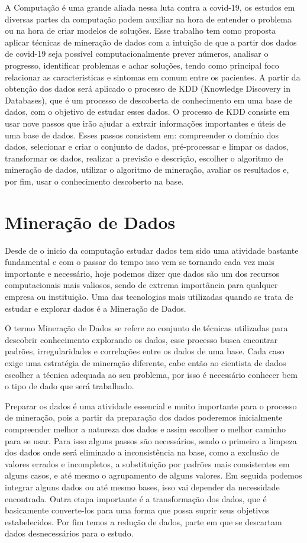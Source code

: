 \documentclass[tcc1]{uftex}
\begin{document}
A Computação é uma grande aliada nessa luta contra a covid-19, os estudos em diversas partes da computação podem auxiliar na hora de entender o problema ou na hora de criar modelos de soluções. Esse trabalho tem como proposta aplicar técnicas de mineração de dados com a intuição de que a partir dos dados de covid-19 seja possível computacionalmente prever números, analisar o progresso, identificar problemas e achar soluções, tendo como principal foco relacionar as caracteristicas e sintomas em comum entre os pacientes. A partir da obtenção dos dados será aplicado o processo de KDD (Knowledge Discovery in Databases), que é um processo de descoberta de conhecimento em uma base de dados, com o objetivo de estudar esses dados. O processo de KDD consiste em usar nove passos que irão ajudar a extrair informações importantes e úteis de uma base de dados. Esses passos consistem em: compreender o domínio dos dados, selecionar e criar o conjunto de dados, pré-processar e limpar os dados, transformar os dados, realizar a previsão e descrição, escolher o algoritmo de mineração de dados, utilizar o algoritmo de mineração, avaliar os resultados e, por fim, usar o conhecimento descoberto na base.\cite{fayyad1996kdd}

\chapter{Mineração de Dados}

Desde de o inicio da computação estudar dados tem sido uma atividade bastante fundamental e com o passar do tempo isso vem se tornando cada vez mais importante e necessário, hoje podemos dizer que dados são um dos recursos computacionais mais valiosos, sendo de extrema importância para qualquer empresa ou instituição. Uma das tecnologias mais utilizadas quando se trata de estudar e explorar dados é a Mineração de Dados. 

	O termo Mineração de Dados se refere ao conjunto de técnicas utilizadas para descobrir conhecimento explorando os dados, esse processo busca encontrar padrões, irregularidades e correlações entre os dados de uma base. Cada caso exige uma estratégia de mineração diferente, cabe então ao cientista de dados escolher a técnica adequada ao seu problema, por isso é necessário conhecer bem o tipo de dado que será trabalhado. 
	
Preparar os dados é uma atividade essencial e muito importante para o processo de mineração, pois a partir da preparação dos dados poderemos inicialmente compreender melhor a natureza dos dados e assim escolher o melhor caminho para se usar. Para isso alguns passos são necessários, sendo o primeiro a limpeza dos dados onde será eliminado a inconsistência na base, como a exclusão de valores errados e incompletos, a substituição por padrões mais consistentes em alguns casos, e até mesmo o agrupamento de alguns valores. Em seguida podemos integrar alguns dados ou até mesmo bases, isso vai depender da necessidade encontrada. Outra etapa importante é a transformação dos dados, que é basicamente converte-los para uma forma que possa suprir seus objetivos estabelecidos. Por fim temos a redução de dados, parte em que se descartam dados desnecessários para o estudo.\cite{camilo2009mineraccao}
\end{document}
